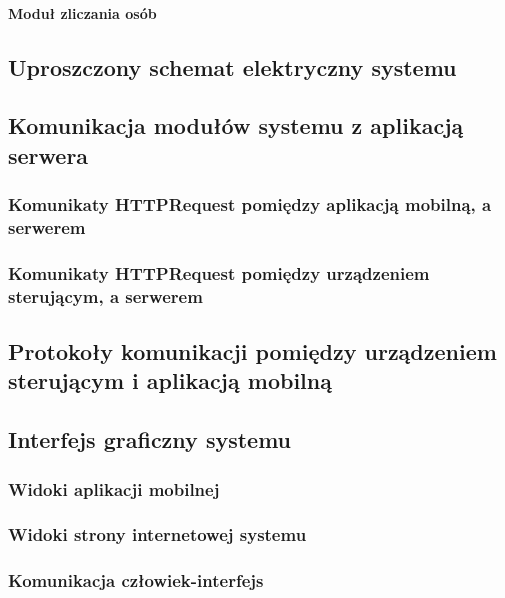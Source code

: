 		\paragraph{Moduł zliczania osób}

\newpage		
\subsection{Uproszczony schemat elektryczny systemu}

\newpage
\subsection{Komunikacja modułów systemu z aplikacją  serwera}

	\subsubsection{Komunikaty HTTPRequest pomiędzy aplikacją mobilną, \newline a serwerem}
	\subsubsection{Komunikaty HTTPRequest pomiędzy urządzeniem sterującym, a serwerem}
	
\newpage
\subsection{Protokoły komunikacji pomiędzy urządzeniem \newline sterującym i aplikacją mobilną}

\newpage
\subsection{Interfejs graficzny systemu}

	\subsubsection{Widoki aplikacji mobilnej}
	
	\subsubsection{Widoki strony internetowej systemu}
	
	\subsubsection{Komunikacja człowiek-interfejs}
	
